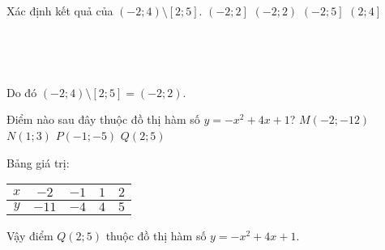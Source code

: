 \begin{ex}%
 Xác định kết quả của $(-2; 4) \setminus [2;5]$.
 \choice
  {$\left(-2; 2\right]$}
  {\True $(-2; 2)$}
  {$\left(-2; 5\right]$}
  {$\left(2; 4\right]$}
 \loigiai
 {
 \begin{center}
   \\
   
   \\
   
  \end{center}
  Do đó $(-2; 4) \setminus [2;5] = (-2;2)$.
 }
\end{ex}


\begin{ex}%
 Điểm nào sau đây thuộc đồ thị hàm số $y = -x^2 + 4x + 1$?
 \choice
  {$M(-2;-12)$}
  {$N(1;3)$}
  {$P(-1;-5)$}
  {\True $Q(2;5)$}
 \loigiai
 {
 Bảng giá trị:
 \begin{center}
  \begin{tabular}{|c|c|c|c|c|}
   \hline
   $x$ & $-2$ & $-1$ & $1$ & $2$\\
   \hline
   $y$ & $-11$ & $-4$ & $4$ & $5$\\
   \hline
  \end{tabular}
 \end{center}
 Vậy điểm $Q(2;5)$ thuộc đồ thị hàm số $y = -x^2 + 4x + 1$.
 }
\end{ex}


